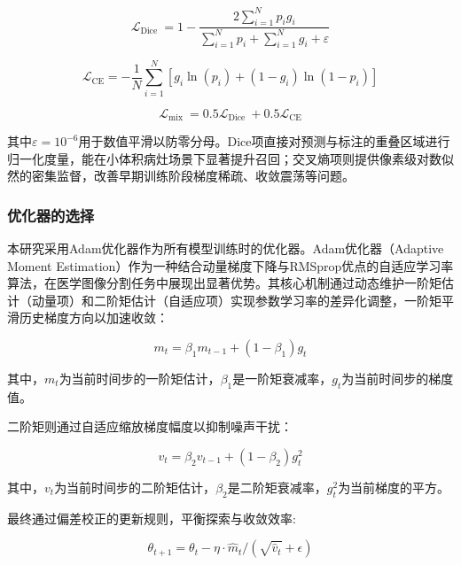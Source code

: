\begin{equation}
    \mathcal{L}_{\text {Dice }}=1-\frac{2 \sum_{i=1}^{N} p_{i} g_{i}}{\sum_{i=1}^{N} p_{i}+\sum_{i=1}^{N} g_{i}+\varepsilon}
\end{equation}

\begin{equation}
    \mathcal{L}_{\mathrm{CE}}=-\frac{1}{N} \sum_{i=1}^{N}\left[g_{i} \ln \left(p_{i}\right)+\left(1-g_{i}\right) \ln \left(1-p_{i}\right)\right]
\end{equation}

\begin{equation}
    \mathcal{L}_{\text {mix }}=0.5 \mathcal{L}_{\text {Dice }}+0.5 \mathcal{L}_{\mathrm{CE}}
\end{equation}

其中$ \varepsilon=10^{-6} $用于数值平滑以防零分母。Dice项直接对预测与标注的重叠区域进行归一化度量，能在小体积病灶场景下显著提升召回；交叉熵项则提供像素级对数似然的密集监督，改善早期训练阶段梯度稀疏、收敛震荡等问题。

\subsubsection{优化器的选择}

本研究采用Adam优化器作为所有模型训练时的优化器。Adam优化器（Adaptive Moment Estimation）作为一种结合动量梯度下降与RMSprop优点的自适应学习率算法，在医学图像分割任务中展现出显著优势。其核心机制通过动态维护一阶矩估计（动量项）和二阶矩估计（自适应项）实现参数学习率的差异化调整，一阶矩平滑历史梯度方向以加速收敛：

\begin{equation}
    m_t = \beta_1 m_{t-1} + (1 - \beta_1) g_t
\end{equation}

其中，$m_t$为当前时间步的一阶矩估计，$\beta_1$是一阶矩衰减率，$g_t$为当前时间步的梯度值。

二阶矩则通过自适应缩放梯度幅度以抑制噪声干扰：

\begin{equation}
    v_t = \beta_2 v_{t-1} + (1 - \beta_2) g_t^2
\end{equation}

其中，$v_t$为当前时间步的二阶矩估计，$\beta_2$是二阶矩衰减率，$g_t^2$为当前梯度的平方。

最终通过偏差校正的更新规则，平衡探索与收敛效率:

\begin{equation}
    \theta_{t+1} = \theta_t - \eta \cdot \hat{m}_t / (\sqrt{\hat{v}_t} + \epsilon)
\end{equation}

